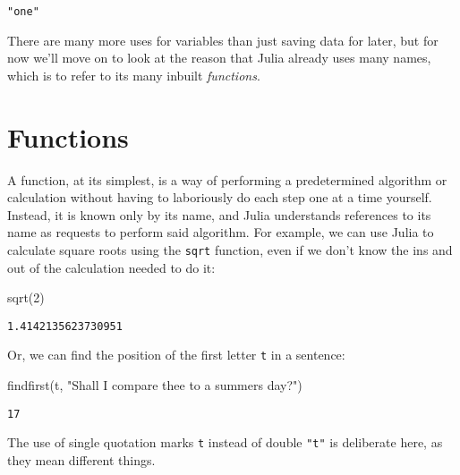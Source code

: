 \documentclass[
  letterpaper,
  DIV=11,
  numbers=noendperiod]{scrreprt}
\newenvironment{Shaded}{\begin{snugshade}}{\end{snugshade}}
\newcommand{\CharTok}[1]{\textcolor[rgb]{0.13,0.47,0.30}{#1}}
\newcommand{\FloatTok}[1]{\textcolor[rgb]{0.68,0.00,0.00}{#1}}
\newcommand{\FunctionTok}[1]{\textcolor[rgb]{0.28,0.35,0.67}{#1}}
\newcommand{\NormalTok}[1]{\textcolor[rgb]{0.00,0.23,0.31}{#1}}
\newcommand{\StringTok}[1]{\textcolor[rgb]{0.13,0.47,0.30}{#1}}
\begin{document}
\begin{verbatim}
"one"
\end{verbatim}

There are many more uses for variables than just saving data for later,
but for now we'll move on to look at the reason that Julia already uses
many names, which is to refer to its many inbuilt \emph{functions}.

\hypertarget{functions}{%
\section{Functions}\label{functions}}

A function, at its simplest, is a way of performing a predetermined
algorithm or calculation without having to laboriously do each step one
at a time yourself. Instead, it is known only by its name, and Julia
understands references to its name as requests to perform said
algorithm. For example, we can use Julia to calculate square roots using
the \texttt{sqrt} function, even if we don't know the ins and out of the
calculation needed to do it:

\begin{Shaded}
\begin{Highlighting}[]
\FunctionTok{sqrt}\NormalTok{(}\FloatTok{2}\NormalTok{)}
\end{Highlighting}
\end{Shaded}

\begin{verbatim}
1.4142135623730951
\end{verbatim}

Or, we can find the position of the first letter \texttt{t} in a
sentence:

\begin{Shaded}
\begin{Highlighting}[]
\FunctionTok{findfirst}\NormalTok{(}\CharTok{\textquotesingle{}t\textquotesingle{}}\NormalTok{, }\StringTok{"Shall I compare thee to a summer\textquotesingle{}s day?"}\NormalTok{)}
\end{Highlighting}
\end{Shaded}

\begin{verbatim}
17
\end{verbatim}

\begin{tcolorbox}[enhanced jigsaw, toprule=.15mm, opacitybacktitle=0.6, leftrule=.75mm, breakable, coltitle=black, bottomrule=.15mm, colbacktitle=quarto-callout-warning-color!10!white, bottomtitle=1mm, rightrule=.15mm, title=\textcolor{quarto-callout-warning-color}{\faExclamationTriangle}\hspace{0.5em}{Warning}, colframe=quarto-callout-warning-color-frame, left=2mm, colback=white, opacityback=0, arc=.35mm, toptitle=1mm, titlerule=0mm]

The use of single quotation marks
\texttt{\textquotesingle{}t\textquotesingle{}} instead of double
\texttt{"t"} is deliberate here, as they mean different things.

\end{tcolorbox}
\end{document}
